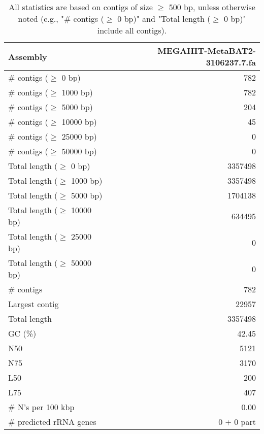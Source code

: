 \documentclass[12pt,a4paper]{article}
\begin{document}
\begin{table}[ht]
\begin{center}
\caption{All statistics are based on contigs of size $\geq$ 500 bp, unless otherwise noted (e.g., "\# contigs ($\geq$ 0 bp)" and "Total length ($\geq$ 0 bp)" include all contigs).}
\begin{tabular}{|l*{1}{|r}|}
\hline
Assembly & MEGAHIT-MetaBAT2-3106237.7.fa \\ \hline
\# contigs ($\geq$ 0 bp) & 782 \\ \hline
\# contigs ($\geq$ 1000 bp) & 782 \\ \hline
\# contigs ($\geq$ 5000 bp) & 204 \\ \hline
\# contigs ($\geq$ 10000 bp) & 45 \\ \hline
\# contigs ($\geq$ 25000 bp) & 0 \\ \hline
\# contigs ($\geq$ 50000 bp) & 0 \\ \hline
Total length ($\geq$ 0 bp) & 3357498 \\ \hline
Total length ($\geq$ 1000 bp) & 3357498 \\ \hline
Total length ($\geq$ 5000 bp) & 1704138 \\ \hline
Total length ($\geq$ 10000 bp) & 634495 \\ \hline
Total length ($\geq$ 25000 bp) & 0 \\ \hline
Total length ($\geq$ 50000 bp) & 0 \\ \hline
\# contigs & 782 \\ \hline
Largest contig & 22957 \\ \hline
Total length & 3357498 \\ \hline
GC (\%) & 42.45 \\ \hline
N50 & 5121 \\ \hline
N75 & 3170 \\ \hline
L50 & 200 \\ \hline
L75 & 407 \\ \hline
\# N's per 100 kbp & 0.00 \\ \hline
\# predicted rRNA genes & 0 + 0 part \\ \hline
\end{tabular}
\end{center}
\end{table}
\end{document}
